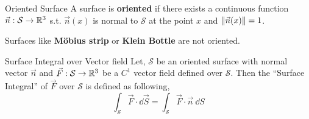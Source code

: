 \documentclass[../Analysis-3.tex]{subfiles}
\begin{document}
\begin{Def}{Oriented Surface}{}
  A surface is \textbf{oriented} if there exists a continuous function $\vec{n} : \mathcal{S} \to \mathbb{R}^3$ s.t. $\vec{n}(x)$ is normal to $\mathcal{S}$ at the point $x$ and $\norm{\vec{n}(x)} = 1$.
\end{Def}

Surfaces like \textbf{Möbius strip} or \textbf{Klein Bottle} are not oriented.

\begin{Def}{Surface Integral over Vector field}{}
  Let, $\mathcal{S}$ be an oriented surface with normal vector $\vec{n}$ and $\vec{F} : \mathcal{S} \to \mathbb{R}^3$ be a $C^1$ vector field defined over $\mathcal{S}$. Then the ``Surface Integral'' of $\vec{F}$ over $\mathcal{S}$ is defined as following,
  \[ \int_{\mathcal{S}} \vec{F} \cdot \dd \vec{S} = \int_{\mathcal{S}} \vec{F}\cdot\vec{n}\ \dd S \]
\end{Def}
\end{document}
